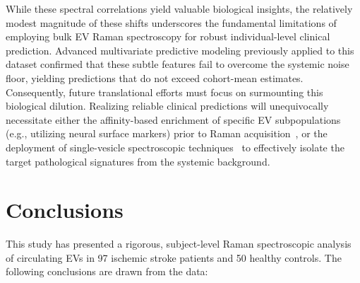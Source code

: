 \documentclass[preprint,12pt]{elsarticle}
\begin{document}
While these spectral correlations yield valuable biological insights, the relatively modest magnitude of these shifts underscores the fundamental limitations of employing bulk EV Raman spectroscopy for robust individual-level clinical prediction. Advanced multivariate predictive modeling previously applied to this dataset confirmed that these subtle features fail to overcome the systemic noise floor, yielding predictions that do not exceed cohort-mean estimates. Consequently, future translational efforts must focus on surmounting this biological dilution. Realizing reliable clinical predictions will unequivocally necessitate either the affinity-based enrichment of specific EV subpopulations (e.g., utilizing neural surface markers) prior to Raman acquisition~\cite{liu2025}, or the deployment of single-vesicle spectroscopic techniques~\cite{jensen2024, koster2021} to effectively isolate the target pathological signatures from the systemic background.

\section{Conclusions}
\label{sec:conclusions}

This study has presented a rigorous, subject-level Raman spectroscopic analysis of circulating EVs in 97 ischemic stroke patients and 50 healthy controls. The following conclusions are drawn from the data:
\end{document}
